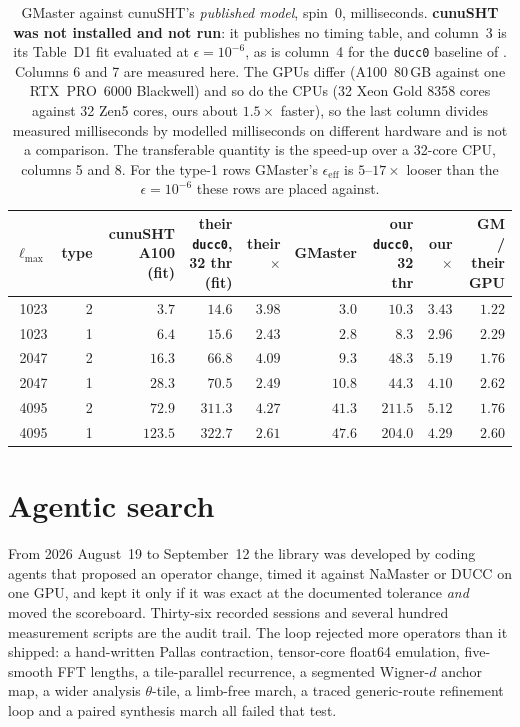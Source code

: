 \documentclass[usenatbib,useAMS]{mnras}
\begin{document}
\begin{table}
\centering
\caption{GMaster against cunuSHT's \emph{published model}, spin~$0$, milliseconds. \textbf{cunuSHT was not installed and not run}: it publishes no timing table, and column~3 is its Table~D1 fit evaluated at $\epsilon=10^{-6}$, as is column~4 for the \texttt{ducc0} baseline of \citet{belkner2024}. Columns 6 and 7 are measured here. The GPUs differ (A100~80\,GB against one RTX~PRO~6000 Blackwell) and so do the CPUs (32 Xeon Gold 8358 cores against 32 Zen5 cores, ours about $1.5\times$ faster), so the last column divides measured milliseconds by modelled milliseconds on different hardware and is not a comparison. The transferable quantity is the speed-up over a 32-core CPU, columns 5 and 8. For the type-1 rows GMaster's $\epsilon_{\mathrm{eff}}$ is $5$--$17\times$ looser than the $\epsilon=10^{-6}$ these rows are placed against.}
\label{tab:cunusht}
\small
\begin{tabular}{@{}rrrrrrrrr@{}}
\toprule
$\ell_{\max}$ & type & cunuSHT A100 (fit) & their \texttt{ducc0}, 32 thr (fit) & their $\times$ & GMaster & our \texttt{ducc0}, 32 thr & our $\times$ & GM / their GPU \\
\midrule
1023 & 2 & $3.7$   & $14.6$  & $3.98$ & $3.0$  & $10.3$  & $3.43$ & $1.22$ \\
1023 & 1 & $6.4$   & $15.6$  & $2.43$ & $2.8$  & $8.3$   & $2.96$ & $2.29$ \\
2047 & 2 & $16.3$  & $66.8$  & $4.09$ & $9.3$  & $48.3$  & $5.19$ & $1.76$ \\
2047 & 1 & $28.3$  & $70.5$  & $2.49$ & $10.8$ & $44.3$  & $4.10$ & $2.62$ \\
4095 & 2 & $72.9$  & $311.3$ & $4.27$ & $41.3$ & $211.5$ & $5.12$ & $1.76$ \\
4095 & 1 & $123.5$ & $322.7$ & $2.61$ & $47.6$ & $204.0$ & $4.29$ & $2.60$ \\
\bottomrule
\end{tabular}
\end{table}

\section{Agentic search}
\label{sec:agents}

From 2026 August~19 to September~12 the library was developed by coding agents that proposed an operator change, timed it against NaMaster or DUCC on one GPU, and kept it only if it was exact at the documented tolerance \emph{and} moved the scoreboard. Thirty-six recorded sessions and several hundred measurement scripts are the audit trail. The loop rejected more operators than it shipped: a hand-written Pallas contraction, tensor-core float64 emulation, five-smooth FFT lengths, a tile-parallel recurrence, a segmented Wigner-$d$ anchor map, a wider analysis $\theta$-tile, a limb-free march, a traced generic-route refinement loop and a paired synthesis march all failed that test.
\end{document}
